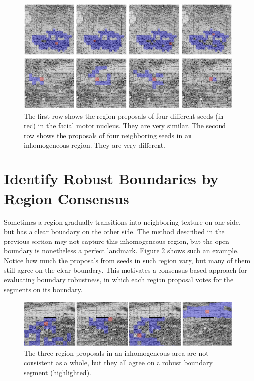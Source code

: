\documentclass{llncs}
\begin{document}

\begin{figure}
	\includegraphics[width=\textwidth]{../figures/ProposalsGoodAndBad.png}
	\caption{The first row shows the region proposals of four different seeds (in red) in the facial motor nucleus. They are very similar. The second row shows the proposals of four neighboring seeds in an inhomogeneous region. They are very different.} %
	\label{fig:ConsistentProposals}
\end{figure}

 
\section{Identify Robust Boundaries by Region Consensus}

Sometimes a region gradually transitions into neighboring texture on one side, but has a clear boundary on the other side. The method described in the previous section may not capture this inhomogeneous region, but the open boundary is nonetheless a perfect landmark. Figure \ref{fig:RobustBoundaryExample} shows such an example. Notice how much the proposals from seeds in such region vary, but many of them still agree on the clear boundary. This motivates a consensus-based approach for evaluating boundary robustness, in which each region proposal votes for the segments on its boundary.
\begin{figure}
	\includegraphics[width=\textwidth]{../figures/RobustBoundaryExampleHighlightLine.png}
	\caption{The three region proposals in an inhomogeneous area are not consistent as a whole, but they all agree on a robust boundary segment (highlighted).}
	\label{fig:RobustBoundaryExample}
\end{figure}
\end{document}
